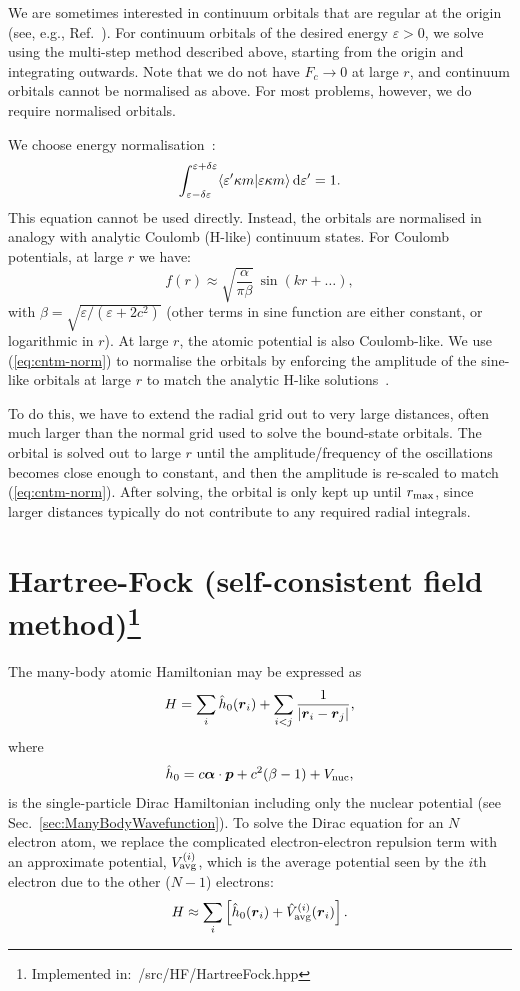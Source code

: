 \documentclass[10pt,twocolumn,a4paper]{article}%
\newcommand{\braket}[1]{\ensuremath{\langle #1\rangle}}	%
\renewcommand{\v}[1]{\ensuremath{\boldsymbol{#1}}}		%
\newcommand{\be}{\begin{equation}}
\newcommand{\ee}{\end{equation}}
\def\d{\ensuremath{{\rm d}}}
\def\en{\ensuremath{\varepsilon}}
\renewcommand{\k}{\ensuremath{\kappa}}
\begin{document}
We are sometimes interested in continuum orbitals that are regular at the origin (see, e.g., Ref.~\cite{BetheBook}).
For continuum orbitals of the desired energy $\en>0$, we solve using the multi-step method described above, starting from the origin and integrating outwards.
Note that we do not have $F_c\to0$ at large $r$, and continuum orbitals cannot be normalised as above.
For most problems, however, we do require normalised orbitals.

We choose energy normalisation~\cite{BetheBook}:
\be
\int_{\en-\delta\en}^{\en+\delta\en}\braket{\en' \k m|\en \k m}\,\d\en' = 1.
\ee
This equation cannot be used directly.
Instead, the orbitals are normalised in analogy with analytic Coulomb (H-like) continuum states.
For Coulomb potentials, at large $r$ we have:
\be\label{eq:cntm-norm}
f(r) \approx \sqrt{\frac{\alpha}{\pi \beta}}\,\sin(kr + \ldots),
\ee
with
$
\beta = \sqrt{{\en}/({\en + 2c^2})}
$
(other terms in sine function are either constant, or logarithmic in $r$).
At large $r$, the atomic potential is also Coulomb-like.
We use (\ref{eq:cntm-norm}) to normalise the orbitals by enforcing the amplitude of the sine-like orbitals at large $r$ to match the analytic H-like solutions~\cite{BetheBook}.

To do this, we have to extend the radial grid out to very large distances, often much larger than the normal grid used to solve the bound-state orbitals.
The orbital is solved out to large $r$ until the amplitude/frequency of the oscillations becomes close enough to constant, and then the amplitude is re-scaled to match (\ref{eq:cntm-norm}).
After solving, the orbital is only kept up until $r_{\rm max}$, since larger distances typically do not contribute to any required radial integrals. 



\section[Hartree-Fock (self-consistent field method)]{Hartree-Fock (self-consistent field method)\footnote{Implemented in:~/src/HF/HartreeFock.hpp}}


The many-body atomic Hamiltonian may be expressed as
\be\label{eq:H-manybody}
H = \sum_i \hat h_{\rm 0}(\v{r}_i) + \sum_{i<j}\frac{1}{|\v{r}_i-\v{r}_j|},
\ee
where 
\[\hat h_0 = c \v{\alpha}\cdot\v{p} + c^2(\beta-1) +  V_{\rm nuc},\]
is the single-particle Dirac Hamiltonian including only the nuclear potential (see Sec.~\ref{sec:ManyBodyWavefunction}).
To solve the Dirac equation for an $N$ electron atom, we replace the complicated electron-electron repulsion term with an approximate potential, $V_{\rm avg}^{(i)}$, 
which is the average potential seen by the $i$th electron due to the other ($N-1$) electrons:
\be
H \approx \sum_i \left[ \hat h_{\rm 0}(\v{r}_i) + \hat V_{\rm avg}^{(i)}(\v{r}_i) \right].
\ee
\end{document}
